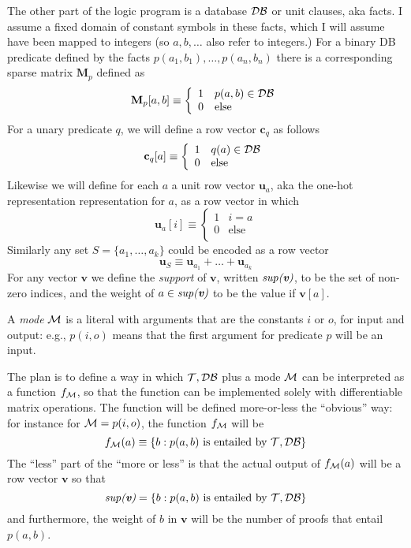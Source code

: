 \documentclass[12pt]{article}
\newcommand{\trm}[1]{\textit{#1}}
\newcommand{\vek}[1]{\textbf{#1}}
\newcommand{\M}{\textbf{M}}
\newcommand{\support}[1]{\textit{sup({#1})}}
\begin{document}
The other part of the logic program is a database ${\cal DB}$ or unit
clauses, aka facts.  I assume a fixed domain of constant symbols in
these facts, which I will assume have been mapped to integers (so
$a,b,\ldots$ also refer to integers.)  For a binary DB predicate
defined by the facts $p(a_1,b_1),\ldots,p(a_n,b_n)$ there is a
corresponding sparse matrix $\M_p$ defined as
\[
  \M_p[a,b] \equiv \left \{
   \begin{array}{ll}
     1 & p(a,b) \in {\cal DB} \\
     0 & \mbox{else} \\
   \end{array}
   \right.
\]
For a unary predicate $q$, we will define a row vector $\vek{c}_q$ as
follows
\[
  \vek{c}_q[a] \equiv \left \{
   \begin{array}{ll}
     1 & q(a) \in {\cal DB} \\
     0 & \mbox{else} \\
   \end{array}
   \right.
\]
Likewise we will define for each $a$ a unit row vector $\vek{u}_a$,
aka the one-hot representation representation for $a$, as a row vector
in which
\[
  \vek{u}_a[i] \equiv \left \{
   \begin{array}{ll}
     1 & \mbox{$i=a$} \\
     0 & \mbox{else} \\
   \end{array}
   \right.
\]
Similarly any set $S=\{a_1,\ldots,a_k\}$ could be encoded as a row
vector 
\[ \vek{u}_S \equiv \vek{u}_{a_1} + \ldots + \vek{u}_{a_k}
\]
For any vector $\vek{v}$ we define the \trm{support} of $\vek{v}$,
written $\support{\vek{v}}$, to be the set of non-zero indices, and the
weight of $a \in \support{\vek{v}}$ to be the value if $\vek{v}[a]$.

A \trm{mode} ${\cal M}$ is a literal with arguments that are the
constants $i$ or $o$, for input and output: e.g., $p(i,o)$ means that
the first argument for predicate $p$ will be an input.

The plan is to define a way in which ${\cal T,DB}$ plus a mode ${\cal
  M}$ can be interpreted as a function $f_{\cal M}$, so that the
function can be implemented solely with differentiable matrix
operations.  The function will be defined more-or-less the ``obvious''
way: for instance for ${\cal M}=p(i,o)$, the function $f_{\cal M}$
will be
\[ f_{\cal M}(a) \equiv \{ b : p(a,b) \mbox{~is entailed by~} {\cal T,DB} \}
\]
The ``less'' part of the ``more or less'' is that the actual output of
$f_{\cal M}(a)$ will be a row vector $\vek{v}$ so that 
\[ \support{\vek{v}} = \{ b : p(a,b) \mbox{~is entailed by~} {\cal T,DB} \}
\]
and furthermore, the weight of $b$ in $\vek{v}$ will be the number of
proofs that entail $p(a,b)$.
\end{document}
